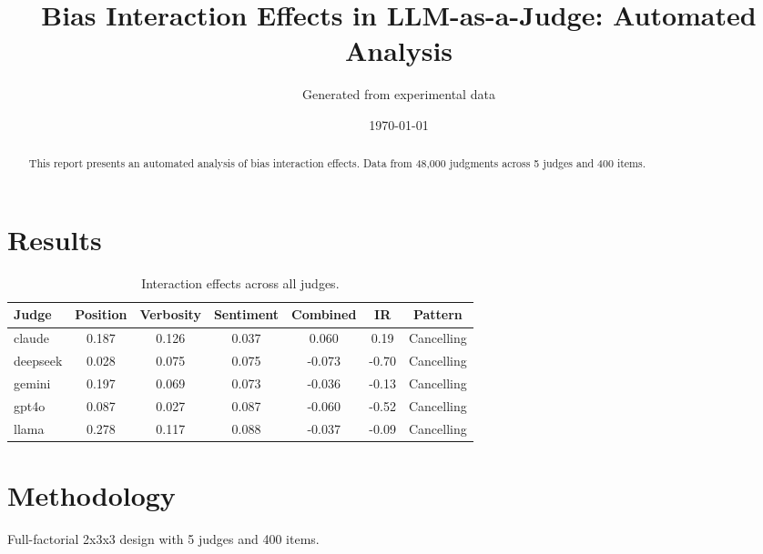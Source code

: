 \documentclass[11pt,twocolumn]{article}
\title{Bias Interaction Effects in LLM-as-a-Judge: Automated Analysis}
\author{Generated from experimental data}
\date{\today}
\begin{document}
\maketitle

\begin{abstract}
This report presents an automated analysis of bias interaction effects. Data from 48,000 judgments across 5 judges and 400 items.
\end{abstract}

\section{Results}

\begin{table}[h]
\centering
\caption{Interaction effects across all judges.}
\label{tab:results}
\begin{tabular}{lcccccc}
\toprule
Judge & Position & Verbosity & Sentiment & Combined & IR & Pattern \\
\midrule
claude & 0.187 & 0.126 & 0.037 & 0.060 & 0.19 & Cancelling \\
deepseek & 0.028 & 0.075 & 0.075 & -0.073 & -0.70 & Cancelling \\
gemini & 0.197 & 0.069 & 0.073 & -0.036 & -0.13 & Cancelling \\
gpt4o & 0.087 & 0.027 & 0.087 & -0.060 & -0.52 & Cancelling \\
llama & 0.278 & 0.117 & 0.088 & -0.037 & -0.09 & Cancelling \\
\bottomrule
\end{tabular}
\end{table}

\section{Methodology}
Full-factorial 2x3x3 design with 5 judges and 400 items.
\end{document}
